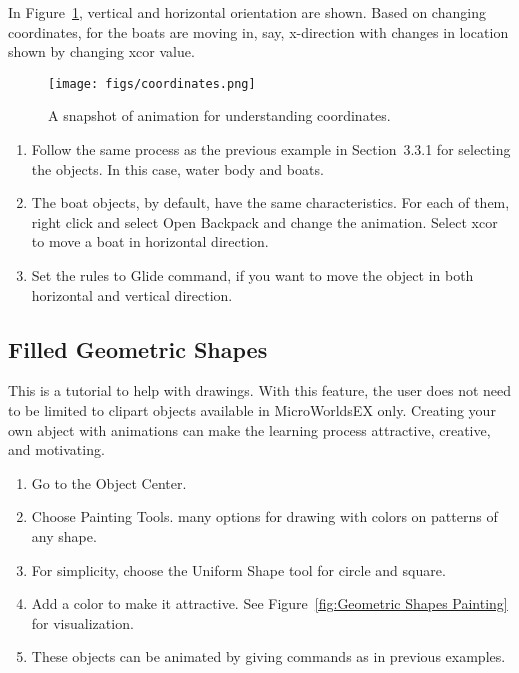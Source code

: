 In Figure~\ref{fig:Coordinates xcor and ycor Animation}, vertical and horizontal orientation are shown. Based on changing coordinates, for the boats are moving in, say, x-direction with changes in location shown by changing xcor value.


\begin{figure}
\centering
\texttt{[image: figs/coordinates.png]}
\caption{A snapshot of animation for understanding coordinates.}
\label{fig:Coordinates xcor and ycor Animation}
\end{figure}

\begin{enumerate}
\item Follow the same process as the previous example in Section~3.3.1 for selecting the objects. In this case, water body and boats.
\item The boat objects, by default, have the same characteristics. For each of them, right click and select Open Backpack and change the animation. 
\subitem Select xcor to move a boat in horizontal direction.
\item Set the rules to Glide command, if you want to move the object in both horizontal and vertical direction.

\end{enumerate}


 
\subsection{Filled Geometric Shapes}

This is a tutorial to help with drawings. With this feature, the user does not need to be limited to clipart objects available in MicroWorldsEX only. Creating your own abject with animations can make the learning process attractive, creative, and motivating.
\begin{enumerate}
\item Go to the Object Center.
\item Choose Painting Tools.
\subitem many options for drawing with colors on patterns of any shape. 
\item For simplicity, choose the Uniform Shape tool for circle and square.
\item Add a color to make it attractive.
	\subitem See Figure~\ref{fig:Geometric Shapes Painting} for visualization.
\item These objects can be animated by giving commands as in previous examples.

\end{enumerate}

